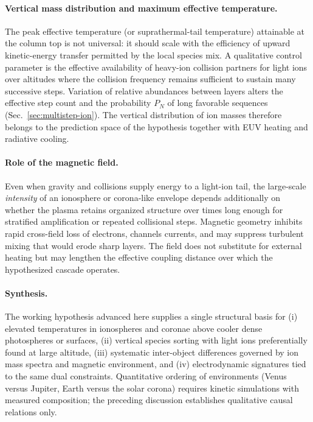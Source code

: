 \documentclass[11pt,a4paper]{article}
\begin{document}
\paragraph{Vertical mass distribution and maximum effective temperature.}
The peak effective temperature (or suprathermal-tail temperature) attainable at the column top is not universal: it should scale with the efficiency of upward kinetic-energy transfer permitted by the local species mix. A qualitative control parameter is the effective availability of heavy-ion collision partners for light ions over altitudes where the collision frequency remains sufficient to sustain many successive steps. Variation of relative abundances between layers alters the effective step count and the probability $P_N$ of long favorable sequences (Sec.~\ref{sec:multistep-ion}). The vertical distribution of ion masses therefore belongs to the prediction space of the hypothesis together with EUV heating and radiative cooling.

\paragraph{Role of the magnetic field.}
Even when gravity and collisions supply energy to a light-ion tail, the large-scale \emph{intensity} of an ionosphere or corona-like envelope depends additionally on whether the plasma retains organized structure over times long enough for stratified amplification or repeated collisional steps. Magnetic geometry inhibits rapid cross-field loss of electrons, channels currents, and may suppress turbulent mixing that would erode sharp layers. The field does not substitute for external heating but may lengthen the effective coupling distance over which the hypothesized cascade operates.

\paragraph{Synthesis.}
The working hypothesis advanced here supplies a single structural basis for (i) elevated temperatures in ionospheres and coronae above cooler dense photospheres or surfaces, (ii) vertical species sorting with light ions preferentially found at large altitude, (iii) systematic inter-object differences governed by ion mass spectra and magnetic environment, and (iv) electrodynamic signatures tied to the same dual constraints. Quantitative ordering of environments (Venus versus Jupiter, Earth versus the solar corona) requires kinetic simulations with measured composition; the preceding discussion establishes qualitative causal relations only.
\end{document}
